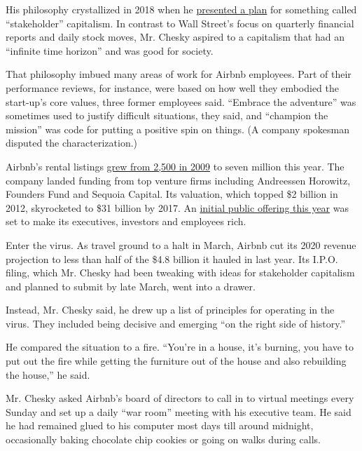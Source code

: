 His philosophy crystallized in 2018 when he
\href{https://news.airbnb.com/brian-cheskys-open-letter-to-the-airbnb-community-about-building-a-21st-century-company/}{presented
a plan} for something called ``stakeholder'' capitalism. In contrast to
Wall Street's focus on quarterly financial reports and daily stock
moves, Mr. Chesky aspired to a capitalism that had an ``infinite time
horizon'' and was good for society.

That philosophy imbued many areas of work for Airbnb employees. Part of
their performance reviews, for instance, were based on how well they
embodied the start-up's core values, three former employees said.
``Embrace the adventure'' was sometimes used to justify difficult
situations, they said, and ``champion the mission'' was code for putting
a positive spin on things. (A company spokesman disputed the
characterization.)

Airbnb's rental listings
\href{https://press.airbnb.com/wp-content/uploads/sites/4/2018/08/The-Airbnb-Story-Timeline-EN-GLOBAL.pdf}{grew
from 2,500 in 2009} to seven million this year. The company landed
funding from top venture firms including Andreessen Horowitz, Founders
Fund and Sequoia Capital. Its valuation, which topped \$2 billion in
2012, skyrocketed to \$31 billion by 2017. An
\href{https://www.nytimes.com/2019/09/20/technology/airbnb-employees-ipo-payouts.html}{initial
public offering this year} was set to make its executives, investors and
employees rich.

Enter the virus. As travel ground to a halt in March, Airbnb cut its
2020 revenue projection to less than half of the \$4.8 billion it hauled
in last year. Its I.P.O. filing, which Mr. Chesky had been tweaking with
ideas for stakeholder capitalism and planned to submit by late March,
went into a drawer.

Instead, Mr. Chesky said, he drew up a list of principles for operating
in the virus. They included being decisive and emerging ``on the right
side of history.''

He compared the situation to a fire. ``You're in a house, it's burning,
you have to put out the fire while getting the furniture out of the
house and also rebuilding the house,'' he said.

Mr. Chesky asked Airbnb's board of directors to call in to virtual
meetings every Sunday and set up a daily ``war room'' meeting with his
executive team. He said he had remained glued to his computer most days
till around midnight, occasionally baking chocolate chip cookies or
going on walks during calls.

